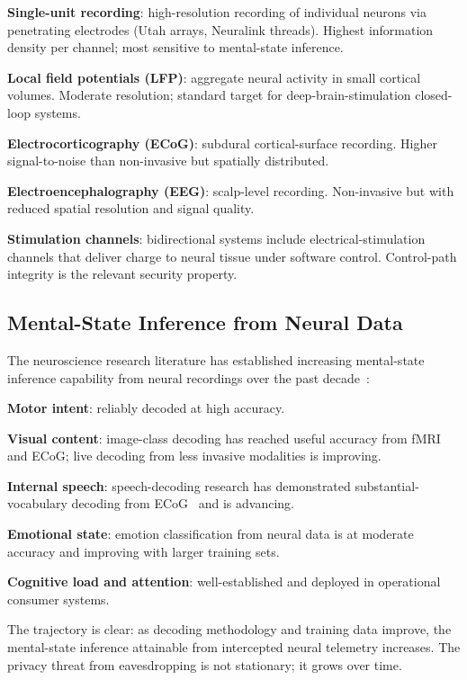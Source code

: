 \documentclass[sigconf,nonacm]{acmart}
\begin{document}
\textbf{Single-unit recording}: high-resolution recording of
individual neurons via penetrating electrodes (Utah arrays,
Neuralink threads). Highest information density per channel; most
sensitive to mental-state inference.

\textbf{Local field potentials (LFP)}: aggregate neural activity in
small cortical volumes. Moderate resolution; standard target for
deep-brain-stimulation closed-loop systems.

\textbf{Electrocorticography (ECoG)}: subdural cortical-surface
recording. Higher signal-to-noise than non-invasive but spatially
distributed.

\textbf{Electroencephalography (EEG)}: scalp-level recording.
Non-invasive but with reduced spatial resolution and signal
quality.

\textbf{Stimulation channels}: bidirectional systems include
electrical-stimulation channels that deliver charge to neural tissue
under software control. Control-path integrity is the relevant
security property.

\subsection{Mental-State Inference from Neural Data}

The neuroscience research literature has established increasing
mental-state inference capability from neural recordings over the
past decade~\cite{anumanchipalli2024neural,liu2024mentalstate}:

\textbf{Motor intent}: reliably decoded at high accuracy.

\textbf{Visual content}: image-class decoding has reached useful
accuracy from fMRI and ECoG; live decoding from less invasive
modalities is improving.

\textbf{Internal speech}: speech-decoding research has demonstrated
substantial-vocabulary decoding from ECoG~\cite{anumanchipalli2024neural}
and is advancing.

\textbf{Emotional state}: emotion classification from neural data
is at moderate accuracy and improving with larger training sets.

\textbf{Cognitive load and attention}: well-established and
deployed in operational consumer systems.

The trajectory is clear: as decoding methodology and training
data improve, the mental-state inference attainable from
intercepted neural telemetry increases. The privacy threat from
eavesdropping is not stationary; it grows over time.
\end{document}
